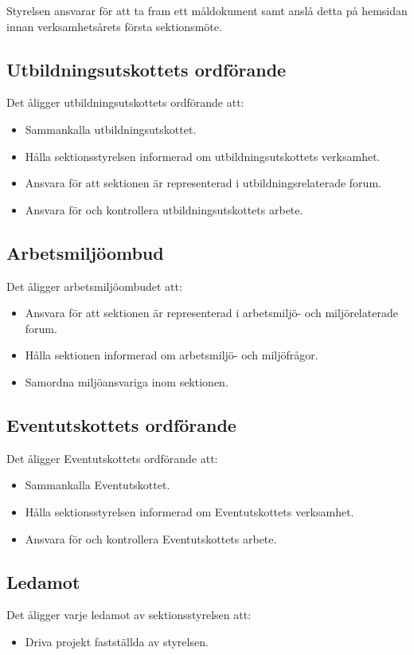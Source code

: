 \documentclass{datateknologsektionen-document}
\begin{document}
Styrelsen ansvarar för att ta fram ett måldokument samt anslå detta på hemsidan
innan verksamhetsårets första sektionsmöte.

\subsection{Utbildningsutskottets ordförande}
\label{utbuordf}
Det åligger utbildningsutskottets ordförande att:
\begin{itemize}
  \item Sammankalla utbildningsutskottet.
  \item Hålla sektionsstyrelsen informerad om utbildningsutskottets verksamhet.
  \item Ansvara för att sektionen är representerad i utbildningsrelaterade forum.
  \item Ansvara för och kontrollera utbildningsutskottets arbete.
\end{itemize}

\subsection{Arbetsmiljöombud}
\label{amo}
Det åligger arbetsmiljöombudet att:
\begin{itemize}
  \item Ansvara för att sektionen är representerad i arbetsmiljö- och miljörelaterade forum.
  \item Hålla sektionen informerad om arbetsmiljö- och miljöfrågor.
  \item Samordna miljöansvariga inom sektionen.
\end{itemize}

\subsection{Eventutskottets ordförande}
\label{aktivitetshanterare}
Det åligger Eventutskottets ordförande att:
\begin{itemize}
  \item Sammankalla Eventutskottet.
  \item Hålla sektionsstyrelsen informerad om Eventutskottets verksamhet.
  \item Ansvara för och kontrollera Eventutskottets arbete.
  
\end{itemize}

\subsection{Ledamot}
\label{ledamot}
Det åligger varje ledamot av sektionsstyrelsen att:
\begin{itemize}
  \item Driva projekt fastställda av styrelsen.
\end{itemize}
\end{document}
